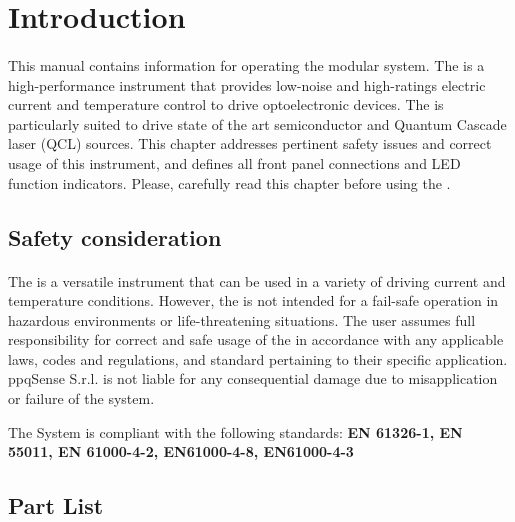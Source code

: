 \section{Introduction}  \label{cpt:instruction}
\paragraph{}This manual contains information for operating the modular \QubeModel  system. The \QubeModel  is a high-performance instrument that provides low-noise and high-ratings electric current and temperature control to drive optoelectronic devices. The \QubeModel  is particularly suited to drive state of the art semiconductor and Quantum Cascade laser (QCL) sources. 
This chapter addresses pertinent safety issues and correct usage of this instrument, and defines all front panel connections and LED function indicators. Please, carefully read this chapter before using the \QubeModel .





\subsection{Safety consideration}   \label{cpt:safety_consideration}
\paragraph{}The \QubeModel  is a versatile instrument that can be used in a variety of driving current and temperature conditions. However, the \QubeModel  is not intended for a fail-safe operation in hazardous environments or life-threatening situations. The user assumes full responsibility for correct and safe usage of the \QubeModel  in accordance with any applicable laws, codes and regulations, and standard pertaining to their specific application. ppqSense S.r.l. is not liable for any consequential damage due to misapplication or failure of the \QubeModel  system.

The \QubeModel  System is compliant with the following standards: 
\newline
\textbf{EN 61326-1, EN 55011, EN 61000-4-2, EN61000-4-8, EN61000-4-3}





\subsection{Part List}  \label{cpt:Part_list}
